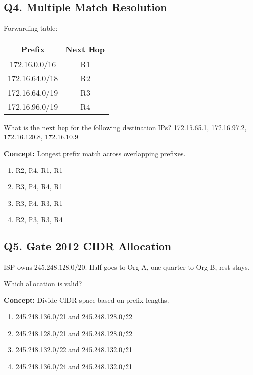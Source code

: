 
\subsection*{Q4. Multiple Match Resolution}
Forwarding table:

\begin{table}[H]
\centering
\begin{tabular}{|c|c|}
\hline
\textbf{Prefix} & \textbf{Next Hop} \\
\hline
172.16.0.0/16 & R1 \\
172.16.64.0/18 & R2 \\
172.16.64.0/19 & R3 \\
172.16.96.0/19 & R4 \\
\hline
\end{tabular}
\end{table}

What is the next hop for the following destination IPs?
172.16.65.1, 172.16.97.2, 172.16.120.8, 172.16.10.9

\textbf{Concept:} Longest prefix match across overlapping prefixes.

\begin{enumerate}[label=(\alph*)]
\item R2, R4, R1, R1  
\item R3, R4, R4, R1  
\item R3, R4, R3, R1  
\item R2, R3, R3, R4
\end{enumerate}


\subsection*{Q5. Gate 2012 CIDR Allocation}
ISP owns $245.248.128.0/20$.
Half goes to Org A, one-quarter to Org B, rest stays.

Which allocation is valid?

\textbf{Concept:} Divide CIDR space based on prefix lengths.

\begin{enumerate}[label=(\alph*)]
\item 245.248.136.0/21 and 245.248.128.0/22  
\item 245.248.128.0/21 and 245.248.128.0/22  
\item 245.248.132.0/22 and 245.248.132.0/21  
\item 245.248.136.0/24 and 245.248.132.0/21  
\end{enumerate}

